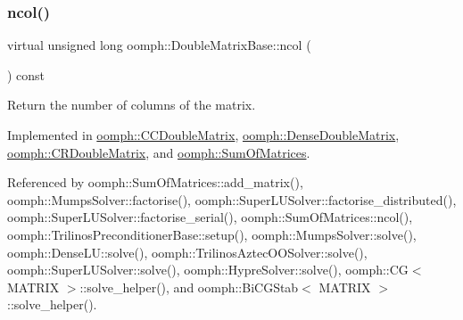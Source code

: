 \mbox{\label{classoomph_1_1DoubleMatrixBase_a253feffbf1db1976cdd86c6134c50abe}} 
\subsubsection{\texorpdfstring{ncol()}{ncol()}}
{\footnotesize\ttfamily virtual unsigned long oomph\+::\+Double\+Matrix\+Base\+::ncol (\begin{DoxyParamCaption}{ }\end{DoxyParamCaption}) const\hspace{0.3cm}{\ttfamily [pure virtual]}}



Return the number of columns of the matrix. 



Implemented in \hyperlink{classoomph_1_1CCDoubleMatrix_aa38cc544ab30f9318161763e13c20957}{oomph\+::\+C\+C\+Double\+Matrix}, \hyperlink{classoomph_1_1DenseDoubleMatrix_aec36d12984999f29f5fc21feea55df1d}{oomph\+::\+Dense\+Double\+Matrix}, \hyperlink{classoomph_1_1CRDoubleMatrix_a4ed5597d8a34dd14f90b0e6cfb88ca2e}{oomph\+::\+C\+R\+Double\+Matrix}, and \hyperlink{classoomph_1_1SumOfMatrices_ad18b4591850b5e89ee6695407aaeec54}{oomph\+::\+Sum\+Of\+Matrices}.



Referenced by oomph\+::\+Sum\+Of\+Matrices\+::add\+\_\+matrix(), oomph\+::\+Mumps\+Solver\+::factorise(), oomph\+::\+Super\+L\+U\+Solver\+::factorise\+\_\+distributed(), oomph\+::\+Super\+L\+U\+Solver\+::factorise\+\_\+serial(), oomph\+::\+Sum\+Of\+Matrices\+::ncol(), oomph\+::\+Trilinos\+Preconditioner\+Base\+::setup(), oomph\+::\+Mumps\+Solver\+::solve(), oomph\+::\+Dense\+L\+U\+::solve(), oomph\+::\+Trilinos\+Aztec\+O\+O\+Solver\+::solve(), oomph\+::\+Super\+L\+U\+Solver\+::solve(), oomph\+::\+Hypre\+Solver\+::solve(), oomph\+::\+C\+G$<$ M\+A\+T\+R\+I\+X $>$\+::solve\+\_\+helper(), and oomph\+::\+Bi\+C\+G\+Stab$<$ M\+A\+T\+R\+I\+X $>$\+::solve\+\_\+helper().

\mbox{\label{classoomph_1_1DoubleMatrixBase_acdcd6e1ea2bf2380f1a2fa32c7829cb5}} 

